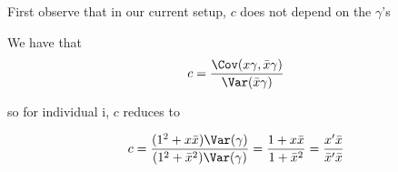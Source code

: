 First observe that in our current setup, $c$ does not depend on the $\gamma$'s

We have that
\begin{align*}
	c = \frac{\Cov (x \gamma, \bar{x} \gamma)}{ \Var( \bar{x} \gamma )}
\end{align*} 

so for individual i, $c$ reduces to


\begin{align*}
	c = \frac{(1^2 + x \bar{x})\Var(\gamma)}{(1^2 + \bar{x}^2)\Var(\gamma)} = \frac{1 + x \bar{x}}{1 + \bar{x}^2} = \frac{x' \bar{x}}{\bar{x}' \bar{x}}
\end{align*} 






